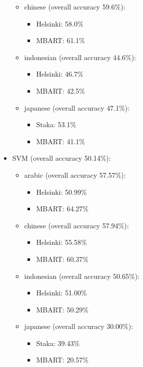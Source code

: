 \documentclass[twocolumn]{article}
\begin{document}
\begin{itemize}
\begin{itemize}
		\item{chinese} (overall accuracy 59.6\%):
		\begin{itemize}
			\item Helsinki: 58.0\%
			\item MBART: 61.1\%
		\end{itemize}
  
		\item{indonesian} (overall accuracy 44.6\%):
		\begin{itemize}
			\item Helsinki: 46.7\%
			\item MBART: 42.5\%
		\end{itemize}
  
		\item{japanese} (overall accuracy 47.1\%):
		\begin{itemize}
			\item Staka: 53.1\%
			\item MBART: 41.1\%
		\end{itemize}
		\end{itemize}
	\item SVM (overall accuracy 50.14\%):
		\begin{itemize}
		\item{arabic (overall accuracy 57.57\%)}:
  		\begin{itemize}
			\item Helsinki: 50.99\%
			\item MBART: 64.27\%
		\end{itemize}
		\item{chinese (overall accuracy 57.94\%)}:
            \begin{itemize}
			\item Helsinki: 55.58\%
			\item MBART: 60.37\%
		\end{itemize}
		\item{indonesian (overall accuracy 50.65\%)}:
            \begin{itemize}
			\item Helsinki: 51.00\%
			\item MBART: 50.29\%
		\end{itemize}
            \item{japanese (overall accuracy 30.00\%)}:
            \begin{itemize}
			\item Staka: 39.43\%
			\item MBART: 20.57\%
		\end{itemize}

\end{itemize}
\end{itemize}
\end{document}

